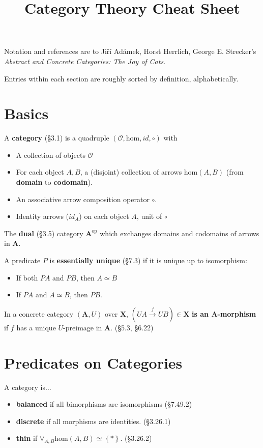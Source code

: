 \documentclass[10pt,twocolumn,letterpaper]{article}
\title{Category Theory Cheat Sheet}
\newcommand{\set}[1]{\left\{{#1}\right\}}
\newcommand{\defn}[1]{{\bf #1}}
\begin{document}
Notation and references are to Ji\v{r}\'i Ad\'amek, Horst Herrlich, George
E. Strecker's {\em Abstract and Concrete Categories: The Joy of Cats}.

Entries within each section are roughly sorted by definition, alphabetically.

\section{Basics}

  A \defn{category} (\S3.1) is a quadruple
  $(\mathcal{O},\mbox{hom},id,\circ)$ with
  \begin{itemize}
    \item A collection of objects $\mathcal{O}$
  \item For each object $A,B$, a (disjoint) collection of arrows
    $\mbox{hom}(A,B)$ (from \defn{domain} to \defn{codomain}).
    \item An associative arrow composition operator $\circ$.
    \item Identity arrows ($id_A$) on each object $A$, unit of $\circ$
  \end{itemize}

  The \defn{dual} (\S3.5) category $\mathbf{A}^\text{op}$ which
    exchanges domains and codomains of arrows in $\mathbf{A}$.

  A predicate $P$ is \defn{essentially unique} (\S7.3) if it is unique up to
  isomorphism:
  \begin{itemize}
    \item If both $PA$ and $PB$, then $A \simeq B$
    \item If $PA$ and $A \simeq B$, then $PB$.
  \end{itemize}

  In a concrete category $(\mathbf{A}, U)$ over $\mathbf{X}$, $(UA
  \overset{f}{\to} UB) \in \mathbf{X}$ \defn{is an $\mathbf{A}$-morphism} if
  $f$ has a unique $U$-preimage in $\mathbf{A}$. (\S5.3, \S6.22)

\section{Predicates on Categories}

  A category is$\dots$
  \begin{itemize}
    \item \defn{balanced} if all bimorphisms are isomorphisms (\S7.49.2)
    \item \defn{discrete} if all morphisms are identities. (\S3.26.1)
    \item \defn{thin} if $\forall_{A,B} \mbox{hom}(A,B) \simeq \set{*}$. (\S3.26.2)
  \end{itemize}
\end{document}
